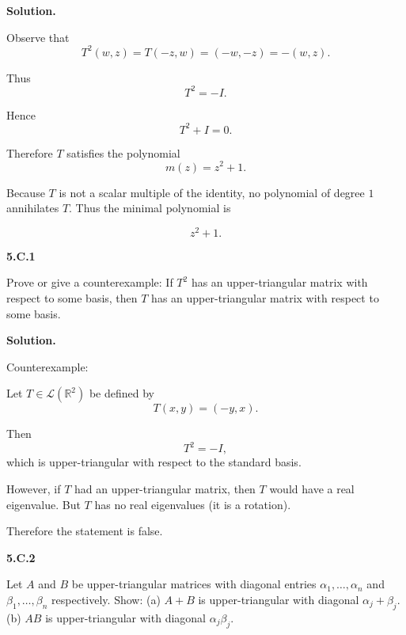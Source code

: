 \documentclass[11pt]{article}
\newcommand{\ProblemDivider}[1]{%
  \vspace{1.0em}
  \noindent\textbf{#1}\par
  \vspace{0.35em}
}
\newcommand{\ProblemAnnounce}{\noindent}
\newcommand{\SolutionAnnounce}{\noindent\textbf{Solution.}\par\medskip}
\begin{document}
\begin{solutionBox}
\SolutionAnnounce
\doublespacing

Observe that
\[
T^2(w,z)=T(-z,w)=(-w,-z)=- (w,z).
\]

Thus
\[
T^2 = -I.
\]

Hence
\[
T^2 + I = 0.
\]

Therefore $T$ satisfies the polynomial
\[
m(z)=z^2+1.
\]

Because $T$ is not a scalar multiple of the identity,
no polynomial of degree $1$ annihilates $T$.
Thus the minimal polynomial is

\[
\boxed{z^2+1}.
\]

\end{solutionBox}

\ProblemDivider{5.C.1}

\begin{problemBox}
\ProblemAnnounce
Prove or give a counterexample:
If $T^2$ has an upper-triangular matrix with respect to some basis,
then $T$ has an upper-triangular matrix with respect to some basis.
\end{problemBox}

\begin{solutionBox}
\SolutionAnnounce
\doublespacing

Counterexample:

Let $T \in \mathcal{L}(\mathbb{R}^2)$ be defined by
\[
T(x,y)=(-y,x).
\]

Then
\[
T^2=-I,
\]
which is upper-triangular with respect to the standard basis.

However, if $T$ had an upper-triangular matrix,
then $T$ would have a real eigenvalue.
But $T$ has no real eigenvalues (it is a rotation).

Therefore the statement is false.

\end{solutionBox}

\ProblemDivider{5.C.2}

\begin{problemBox}
\ProblemAnnounce
Let $A$ and $B$ be upper-triangular matrices with diagonal entries
$\alpha_1,\dots,\alpha_n$ and $\beta_1,\dots,\beta_n$ respectively.
Show:
(a) $A+B$ is upper-triangular with diagonal $\alpha_j+\beta_j$.
(b) $AB$ is upper-triangular with diagonal $\alpha_j\beta_j$.
\end{problemBox}
\end{document}
